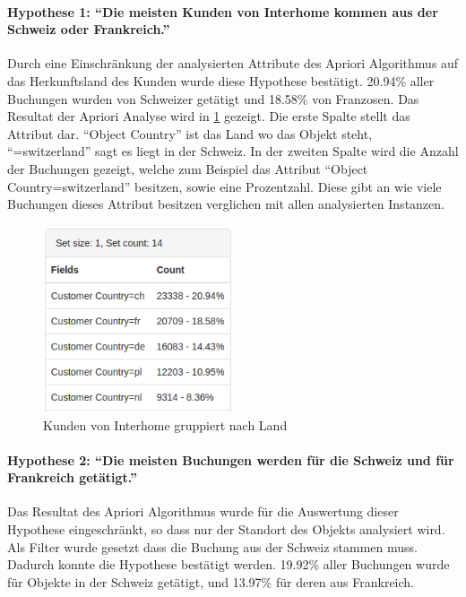 \paragraph{Hypothese 1: "`Die meisten Kunden von Interhome kommen aus der Schweiz oder Frankreich."'} Durch eine Einschränkung der analysierten Attribute des Apriori Algorithmus auf das Herkunftsland des Kunden wurde diese Hypothese bestätigt. 20.94\% aller Buchungen wurden von Schweizer getätigt und 18.58\% von Franzosen. Das Resultat der Apriori Analyse wird in \cref{fig:testingfazit:testing:hypothesen:hypothese1} gezeigt. Die erste Spalte stellt das Attribut dar. "`Object Country"' ist das Land wo das Objekt steht, "`=switzerland"' sagt es liegt in der Schweiz. In der zweiten Spalte wird die Anzahl der Buchungen gezeigt, welche zum Beispiel das Attribut "`Object Country=switzerland"' besitzen, sowie eine Prozentzahl. Diese gibt an wie viele Buchungen dieses Attribut besitzen verglichen mit allen analysierten Instanzen.

\begin{figure}[H]
	\RawFloats
	\centering
	\includegraphics[width=0.5\textwidth]{images/hypothese1}
	\caption{Kunden von Interhome gruppiert nach Land}
	\label{fig:testingfazit:testing:hypothesen:hypothese1}
\end{figure}

\paragraph{Hypothese 2: "`Die meisten Buchungen werden für die Schweiz und für Frankreich getätigt."'} Das Resultat des Apriori Algorithmus wurde für die Auswertung dieser Hypothese eingeschränkt, so dass nur der Standort des Objekts analysiert wird. Als Filter wurde gesetzt dass die Buchung aus der Schweiz stammen muss. Dadurch konnte die Hypothese bestätigt werden. 19.92\% aller Buchungen wurde für Objekte in der Schweiz getätigt, und 13.97\% für deren aus Frankreich.

